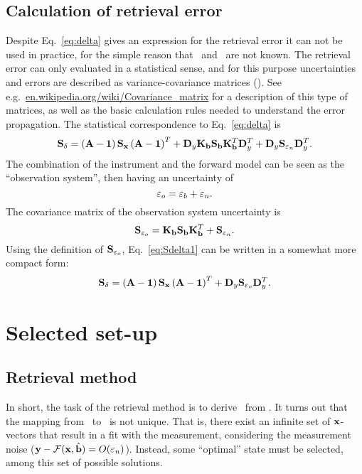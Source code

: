 \subsection{Calculation of retrieval error}
%
Despite Eq.~\ref{eq:delta} gives an expression for the retrieval error it can
not be used in practice, for the simple reason that \SttVct\ and \FrwMdlVct\
are not known. The retrieval error can only evaluated in a statistical sense,
and for this purpose uncertainties and errors are described as
variance-covariance matrices (\CvrMtr). See e.g.\
\url{en.wikipedia.org/wiki/Covariance_matrix} for a description of this type of
matrices, as well as the basic calculation rules needed to understand the error
propagation. The statistical correspondence to Eq.~\ref{eq:delta} is
\begin{equation}
  \label{eq:Sdelta1}
  \mathbf{S}_{\delta} = \left(\mathbf{A}-\mathbf{1}\right)\mathbf{S}_{\mathbf{x}}
  \left(\mathbf{A}-\mathbf{1}\right)^T + 
  \mathbf{D}_{y}\mathbf{K}_{\mathbf{b}}\mathbf{S}_{\mathbf{b}}
  \mathbf{K}_{\mathbf{b}}^T\mathbf{D}_{y}^T + 
  \mathbf{D}_{y}\mathbf{S}_{\varepsilon_n}\mathbf{D}_{y}^T.
\end{equation}
The combination of the instrument and the forward model can be seen as
the ``observation system'', then having an uncertainty of
\begin{equation}
  \label{eq:eps_o}
  \varepsilon_o = \varepsilon_b + \varepsilon_n. 
\end{equation}
The covariance matrix of the observation system uncertainty is 
\begin{equation}
  \label{eq:So}
  \mathbf{S}_{\varepsilon_o} = \mathbf{K}_{\mathbf{b}}\mathbf{S}_{\mathbf{b}}
  \mathbf{K}_{\mathbf{b}}^T + \mathbf{S}_{\varepsilon_n}.
\end{equation}
Using the definition of $\mathbf{S}_{\varepsilon_o}$, Eq.~\ref{eq:Sdelta1}
can be written in a somewhat more compact form:
\begin{equation}
  \label{eq:Sdelta2}
  \mathbf{S}_{\delta} = \left(\mathbf{A}-\mathbf{1}\right)\mathbf{S}_{\mathbf{x}}
  \left(\mathbf{A}-\mathbf{1}\right)^T + \mathbf{D}_{y}\mathbf{S}_{\varepsilon_o}\mathbf{D}_{y}^T.
\end{equation}



\section{Selected set-up}
\label{sec:setup}

\subsection{Retrieval method}
\label{sec:setup:inverse}
%
In short, the task of the retrieval method is to derive \RtrVct\ from \MsrVct.
It turns out that the mapping from \MsrVct\ to \RtrVct\ is not unique. That is,
there exist an infinite set of $\mathbf{x}$-vectors that result in a fit with the
measurement, considering the measurement noise
($\mathbf{y}-\mathcal{F}(\mathbf{x},\hat{\mathbf{b}})=O(\varepsilon_n)$\todo{Is this correct
  nomenclature?}). Instead, some ``optimal'' state must be selected, among this
set of possible solutions.

